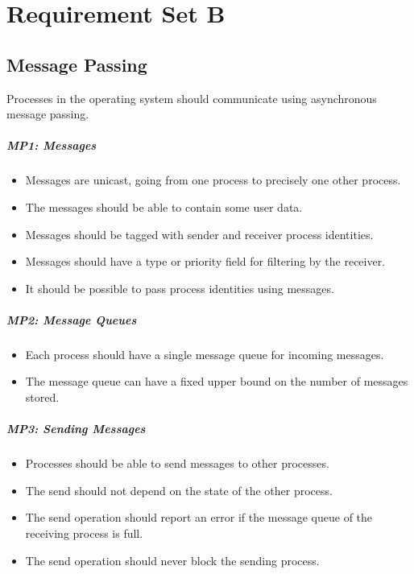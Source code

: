 \chapter{Requirement Set B}

\section{Message Passing}

Processes in the operating system should communicate using asynchronous message passing.

\paragraph*{MP1: Messages}

\begin{itemize}
  \item Messages are unicast, going from one process to precisely one other process.
  \item  The messages should be able to contain some user data.
  \item  Messages should be tagged with sender and receiver process identities.
  \item  Messages should have a type or priority field for filtering by the receiver.
  \item  It should be possible to pass process identities using messages.
\end{itemize}

\paragraph*{MP2: Message Queues}

\begin{itemize}
  \item Each process should have a single message queue for incoming messages.
  \item   The message queue can have a fixed upper bound on the number of messages stored.
\end{itemize}

\paragraph*{MP3: Sending Messages}

\begin{itemize}
  \item Processes should be able to send messages to other processes.
  \item  The send should not depend on the state of the other process.
  \item  The send operation should report an error if the message queue of the receiving process is full.
  \item  The send operation should never block the sending process.
\end{itemize}

